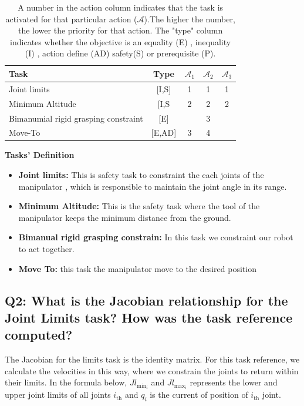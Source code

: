 \documentclass{article}
\begin{document}
\begin{table}[htb]
	\label{tbl:actions_tables}
	\begin{center}
		\footnotesize
		\begin{tabular}{lcccc}
			\toprule		
			Task & Type & $\mathcal{A}_{1}$ & $\mathcal{A}_{2}$  & $\mathcal{A}_{3}$  \\
			\midrule
			Joint limits                      & [I,S] & 1 & 1 & 1 \\
			\hdashline
			Minimum Altitude						& [I,S & 2& 2 & 2\\
			\hdashline 
			Bimanumial rigid grasping constraint					& [E] & & 3 & \\
			\hdashline
			Move-To						& [E,AD] & 3 & 4& \\ 
			
			\bottomrule
		\end{tabular}
	\end{center}
\caption{A number in the action column indicates that the task is activated for that particular action ($\mathcal{A}$).The higher the number, the lower the priority for that action. The "type" column indicates whether the objective is an equality (E) , inequality (I) , action define (AD) safety(S) or prerequisite (P).}
\end{table}
\noindent
\textbf{Tasks' Definition}
\begin{itemize}
	\item \textbf{Joint limits:} This is safety task to constraint the each joints of the manipulator , which is responsible to maintain the joint angle in its range.
	\item \textbf{Minimum Altitude:} This is the safety task where the tool of the manipulator keeps the minimum distance from the ground. 
	\item \textbf{Bimanual rigid grasping constrain:} In this task we constraint our robot to act together. 
	\item \textbf{Move To:} this task the manipulator move to the desired position 
\end{itemize}

\subsection{Q2: What is the Jacobian relationship for the Joint Limits task? How was the task reference computed?}
The Jacobian for the limits task is the identity matrix. For this task reference, we calculate the velocities in this way, where we constrain the joints to return within their limits. In the formula below,  $Jl_{\text{min}_i}$ and $Jl_{\text{max}_i}$  represents the lower and upper joint limits of all joints  $i_{\text{th}}$ and $q_i$ is the current of position of $i_{\text{th}}$ joint.
\end{document}

